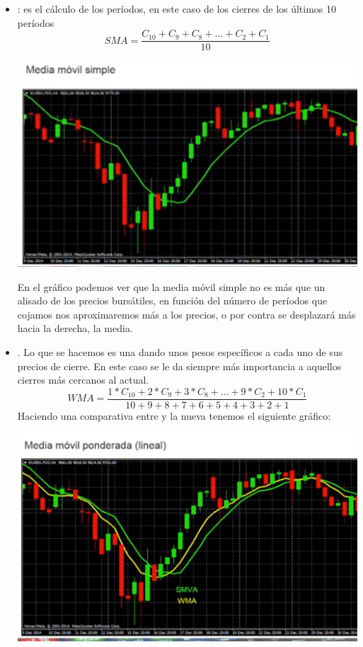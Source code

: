 \begin{itemize}
    \item {}: es el cálculo de los períodos, en este caso de los cierres de los últimos 10 períodos
    $$
    \mathit{SMA} = \frac{C_{10} + C_{9} + C_{8} + \ldots + C_{2} + C_{1}}{10}
    $$
    \begin{center}
        \includegraphics[scale=.80]{images/medmovsim.png}
    \end{center}
    En el gráfico podemos ver que la media móvil simple no es más que un alisado de los precios bursátiles, en función del número de períodos que cojamos nos aproximaremos más a los precios, o por contra se desplazará más hacia la derecha, la media.
    \item {}. Lo que se hacemos es una  dando unos pesos específicos a cada uno de sus precios de cierre. En este caso se le da siempre más importancia a aquellos cierres más cercanos al actual.
    $$
    \mathit{WMA} = \frac{1\ast C_{10} + 2\ast C_{9} + 3\ast C_{8} + \ldots + 9\ast C_{2} + 10\ast C_{1}}{10+9+8+7+6+5+4+3+2+1}
    $$
    Haciendo una comparativa entre  y la nueva  tenemos el siguiente gráfico:
    \begin{center}
        \includegraphics[scale=.80]{images/medmovpon.png}

\end{center}
\end{itemize}
